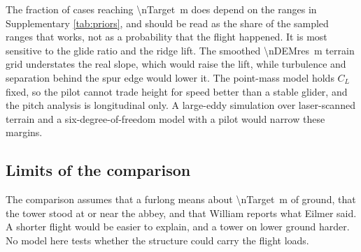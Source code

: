 The fraction of cases reaching \SI{\nTarget}{\meter} does depend on the ranges in Supplementary
\cref{tab:priors}, and should be read as the share of the sampled ranges that works, not as a
probability that the flight happened.
It is most sensitive to the glide ratio and the ridge lift.
The smoothed \SI{\nDEMres}{\meter} terrain grid understates the real slope, which would raise the
lift, while turbulence and separation behind the spur edge would lower it.
The point-mass model holds \(C_L\) fixed, so the pilot cannot trade height for speed better
than a stable glider, and the pitch analysis is longitudinal only.
A large-eddy simulation over laser-scanned terrain and a six-degree-of-freedom model with a pilot
would narrow these margins.

\subsection{Limits of the comparison}

The comparison assumes that a furlong means about \SI{\nTarget}{\meter} of ground, that the tower
stood at or near the abbey, and that William reports what Eilmer said.
A shorter flight would be easier to explain, and a tower on lower ground harder.
No model here tests whether the structure could carry the flight loads.
